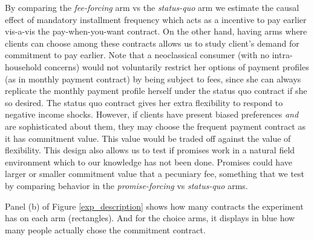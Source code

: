 \documentclass[11pt]{article}
\begin{document}
By comparing the \textit{fee-forcing} arm vs the \textit{status-quo} arm we estimate the causal effect of mandatory installment frequency which acts as a incentive to pay earlier vis-a-vis the pay-when-you-want contract. On the other hand, having arms where clients can choose among these contracts allows us to study client's demand for commitment to pay earlier. Note that a neoclassical consumer (with no intra-household concerns) would not voluntarily restrict her options of payment profiles (as in monthly payment contract) by being subject to fees, since she can always replicate the monthly payment profile herself under the status quo contract if she so desired. The status quo contract gives her extra flexibility to respond to negative income shocks. However, if clients have present biased preferences \textit{and} are sophisticated about them, they may choose the frequent payment contract as it has commitment value. This value would be traded off against the value of flexibility. This design also allows us to test if promises work in a natural field environment which to our knowledge has not been done. Promises could have larger or smaller commitment value that a pecuniary fee, something that we test by comparing behavior in the \textit{promise-forcing}  vs \textit{status-quo} arms. 

Panel (b) of Figure \ref{exp_description} shows how many contracts the experiment has on each arm (rectangles). And for the choice arms, it displays in blue how many people actually chose the commitment contract.

    
\end{document}
